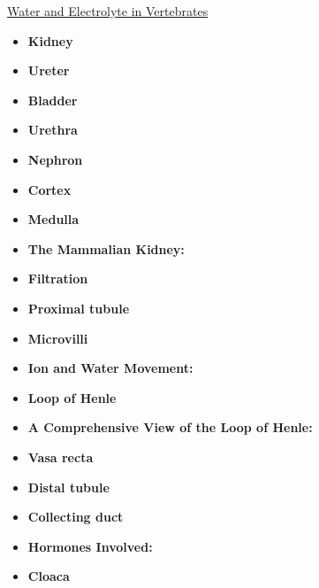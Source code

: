 \documentclass[12pt,letterpaper]{article}
\begin{document}
\hypertarget{40.5}{}
\begin{secbox}{\hyperlink{40}{Water and Electrolyte in Vertebrates}}{
    \begin{itemize}
        \item \textbf{Kidney}
        \item \textbf{Ureter}
        \item \textbf{Bladder}
        \item \textbf{Urethra}
        \item \textbf{Nephron}
        \item \textbf{Cortex}
        \item \textbf{Medulla}
        \item \textbf{The Mammalian Kidney:}
        \item \textbf{Filtration}
        \item \textbf{Proximal tubule}
        \item \textbf{Microvilli}
        \item \textbf{Ion and Water Movement:}
        \item \textbf{Loop of Henle}
        \item \textbf{A Comprehensive View of the Loop of Henle:}
        \item \textbf{Vasa recta}
        \item \textbf{Distal tubule}
        \item \textbf{Collecting duct}
        \item \textbf{Hormones Involved:}
        \item \textbf{Cloaca}
    \end{itemize}
}\end{secbox}
\end{document}
